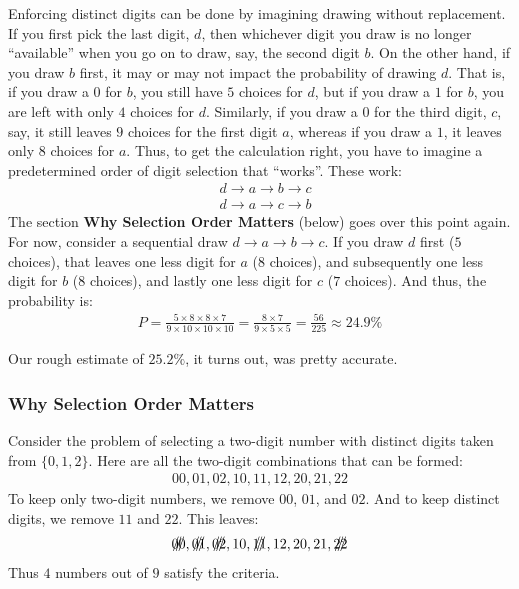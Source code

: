 \documentclass[12pt]{article}
\begin{document}
Enforcing distinct digits can be done by imagining drawing without replacement. If you first pick the last digit, $d$, then whichever digit you draw is no longer ``available'' when you go on to draw, say, the second digit $b$. On the other hand, if you draw $b$ first, it may or may not impact the probability of drawing $d$. That is, if you draw a $0$ for $b$, you still have $5$ choices for $d$, but if you draw a $1$ for $b$, you are left with only $4$ choices for $d$. Similarly, if you draw a $0$ for the third digit, $c$, say, it still leaves $9$ choices for the first digit $a$, whereas if you draw a $1$, it leaves only $8$ choices for $a$. Thus, to get the calculation right, you have to imagine a predetermined order of digit selection that ``works''. These work:
\begin{align*}
& d \rightarrow a \rightarrow b \rightarrow c \\
& d \rightarrow a \rightarrow c \rightarrow b
\end{align*}
The section \textbf{Why Selection Order Matters} (below) goes over this point again. For now, consider a sequential draw $d \rightarrow a \rightarrow b \rightarrow c$. If you draw $d$ first ($5$ choices), that leaves one less digit for $a$ ($8$ choices), and subsequently one less digit for $b$ ($8$ choices), and lastly one less digit for $c$ ($7$ choices). And thus, the probability is:
\begin{align*}
P = \frac{5 \times 8 \times 8 \times 7}{9 \times 10 \times 10 \times 10} 
  = \frac{8 \times 7}{9 \times 5 \times 5} 
  = \frac{56}{225} 
  \approx 24.9\%
\end{align*}

 Our rough estimate of $25.2\%$, it turns out, was pretty accurate. 


\subsubsection*{Why Selection Order Matters}
Consider the problem of selecting a two-digit number with distinct digits taken from $\{0,1,2\}$. Here are all the two-digit combinations that can be formed:
\begin{align*}
00, 01, 02, 10, 11, 12, 20, 21, 22
\end{align*}
To keep only two-digit numbers, we remove $00$, $01$, and $02$. And to keep distinct digits, we remove $11$ and $22$. This leaves: 
\begin{align*}
\crossout[3]{00}, \crossout[3]{01}, \crossout[3]{02}, 
10, \crossout[3]{11}, 12, 20, 21, \crossout[3]{22}
\end{align*}
Thus $4$ numbers out of $9$ satisfy the criteria. 
\end{document}
